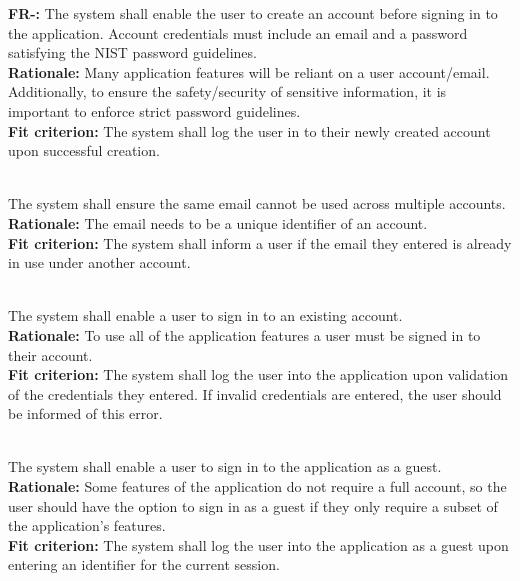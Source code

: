 \documentclass[12pt, titlepage]{article}
\newcounter{FR_Counter}
\begin{document}
\textbf{FR-\the\value{FR_Counter}:}
The system shall enable the user to create an account before signing in to the application. Account credentials must include 
an email and a password satisfying the NIST password guidelines.\\
\textbf{Rationale:}
Many application features will be reliant on a user account/email. Additionally, to ensure the safety/security of sensitive information,
it is important to enforce strict password guidelines. \\
\textbf{Fit criterion:}
The system shall log the user in to their newly created account upon successful creation. \\~\\
\addtocounter{FR_Counter}{1}

The system shall ensure the same email cannot be used across multiple accounts.\\
\textbf{Rationale:}
The email needs to be a unique identifier of an account.\\
\textbf{Fit criterion:}
The system shall inform a user if the email they entered is already in use under another account. \\~\\
\addtocounter{FR_Counter}{1}

The system shall enable a user to sign in to an existing account.\\
\textbf{Rationale:}
To use all of the application features a user must be signed in to their account.\\
\textbf{Fit criterion:}
The system shall log the user into the application upon validation of the credentials they entered. If invalid credentials are entered,
the user should be informed of this error. \\~\\
\addtocounter{FR_Counter}{1}


The system shall enable a user to sign in to the application as a guest.\\
\textbf{Rationale:}
Some features of the application do not require a full account, so the user should have the option to sign in as a guest
if they only require a subset of the application's features.\\
\textbf{Fit criterion:}
The system shall log the user into the application as a guest upon entering an identifier for the current session. \\~\\
\addtocounter{FR_Counter}{1}
\end{document}
